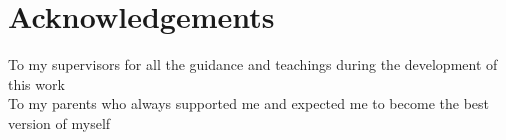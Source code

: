 \chapter*{Acknowledgements}

To my supervisors for all the guidance and teachings during the development of this work \\
To my parents who always supported me and expected me to become the best version of myself \\

\vspace{10mm}
